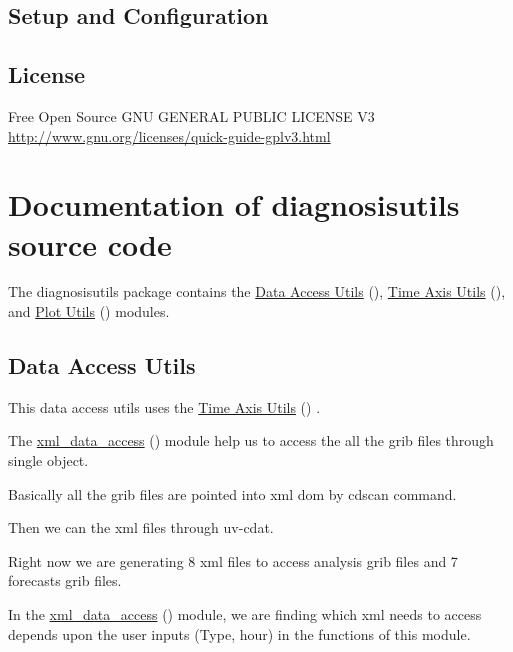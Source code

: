 \documentclass[letterpaper,10pt,english]{sphinxmanual}
\begin{document}
\section{Setup and Configuration}
\label{diag_install:setup-and-configuration}

\section{License}
\label{diag_install:license}
Free Open Source GNU GENERAL PUBLIC LICENSE V3
\href{http://www.gnu.org/licenses/quick-guide-gplv3.html}{http://www.gnu.org/licenses/quick-guide-gplv3.html}


\chapter{Documentation of \textbf{diagnosisutils} source code}
\label{diagnosisutils:documentation-of-diagnosisutils-source-code}\label{diagnosisutils:diagnosisutils}\label{diagnosisutils::doc}
The diagnosisutils package contains the {\hyperref[diagnosisutils:data-access-utils]{Data Access Utils}} (), {\hyperref[diagnosisutils:time-axis-utils]{Time Axis Utils}} (), and {\hyperref[diagnosisutils:plot-utils]{Plot Utils}} () modules.


\section{Data Access Utils}
\label{diagnosisutils:data-access-utils}
This data access utils uses the {\hyperref[diagnosisutils:time-axis-utils]{Time Axis Utils}} () .

The {\hyperref[diagnosisutils:xml-data-access]{xml\_data\_access}} () module help us to access the all the grib files through single object.

Basically all the grib files are pointed into xml dom by cdscan command.

Then we can the xml files through uv-cdat.

Right now we are generating 8 xml files to access analysis grib files and 7 forecasts grib files.

In the {\hyperref[diagnosisutils:xml-data-access]{xml\_data\_access}} () module, we are finding which xml needs to access depends upon the user inputs (Type, hour) in the functions of this module.
\end{document}
